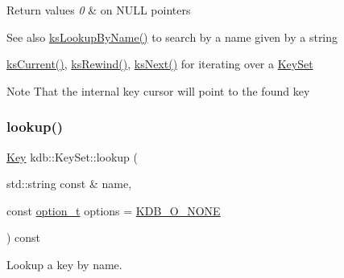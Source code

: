 \begin{DoxyRetVals}{Return values}
{\em 0} & on N\+U\+LL pointers \\
\hline
\end{DoxyRetVals}
\begin{DoxySeeAlso}{See also}
\hyperlink{group__keyset_gad2e30fb6d4739d917c5abb2ac2f9c1a1}{ks\+Lookup\+By\+Name()} to search by a name given by a string 

\hyperlink{group__keyset_ga4287b9416912c5f2ab9c195cb74fb094}{ks\+Current()}, \hyperlink{group__keyset_gabe793ff51f1728e3429c84a8a9086b70}{ks\+Rewind()}, \hyperlink{group__keyset_ga317321c9065b5a4b3e33fe1c399bcec9}{ks\+Next()} for iterating over a \hyperlink{group__keyset}{Key\+Set}
\end{DoxySeeAlso}
\begin{DoxyNote}{Note}
That the internal key cursor will point to the found key 
\end{DoxyNote}
\mbox{\label{classkdb_1_1KeySet_ac17f3423b3a55821ffeab556af89a4f7}} 
\subsubsection{\texorpdfstring{lookup()}{lookup()}\hspace{0.1cm}{\footnotesize\ttfamily [2/2]}}
{\footnotesize\ttfamily \hyperlink{classkdb_1_1Key}{Key} kdb\+::\+Key\+Set\+::lookup (\begin{DoxyParamCaption}\item[{std\+::string const \&}]{name,  }\item[{const \hyperlink{group__keyset_ga98a3d6a4016c9dad9cbd1a99a9c2a45a}{option\+\_\+t}}]{options = {\ttfamily \hyperlink{group__keyset_gga98a3d6a4016c9dad9cbd1a99a9c2a45aa00738455e0ae843c8720809d8287f370}{K\+D\+B\+\_\+\+O\+\_\+\+N\+O\+NE}} }\end{DoxyParamCaption}) const\hspace{0.3cm}{\ttfamily [inline]}}



Lookup a key by name. 


